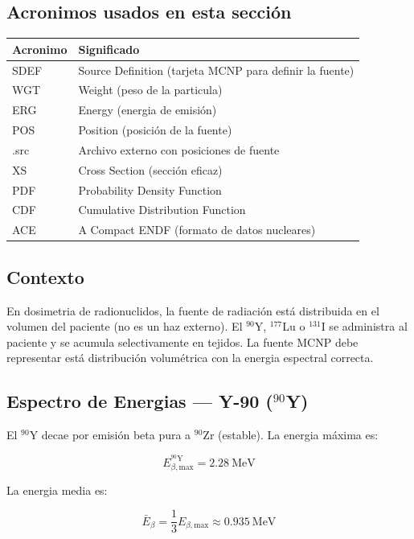\documentclass[12pt,a4paper]{article}
\begin{document}
\subsection*{Acronimos usados en esta sección}
\begin{tabular}{ll}
\toprule
\textbf{Acronimo} & \textbf{Significado} \\
\midrule
SDEF & Source Definition (tarjeta MCNP para definir la fuente) \\
WGT & Weight (peso de la particula) \\
ERG & Energy (energia de emisión) \\
POS & Position (posición de la fuente) \\
.src & Archivo externo con posiciones de fuente \\
XS & Cross Section (sección eficaz) \\
PDF & Probability Density Function \\
CDF & Cumulative Distribution Function \\
ACE & A Compact ENDF (formato de datos nucleares) \\
\bottomrule
\end{tabular}

\subsection{Contexto}

En dosimetria de radionuclidos, la fuente de radiación está distribuida en el volumen del paciente (no es un haz externo). El $^{90}$Y, $^{177}$Lu o $^{131}$I se administra al paciente y se acumula selectivamente en tejidos. La fuente MCNP debe representar está distribución volumétrica con la energia espectral correcta.

\subsection{Espectro de Energias --- Y-90 ($^{90}$Y)}

El $^{90}$Y decae por emisión beta pura a $^{90}$Zr (estable). La energia máxima es:

$$
E_{\beta,\text{max}}^{^{90}\text{Y}} = 2.28\ \text{MeV}
$$


La energia media es:

$$
\bar{E}_\beta = \frac{1}{3} E_{\beta,\text{max}} \approx 0.935\ \text{MeV}
$$
\end{document}
